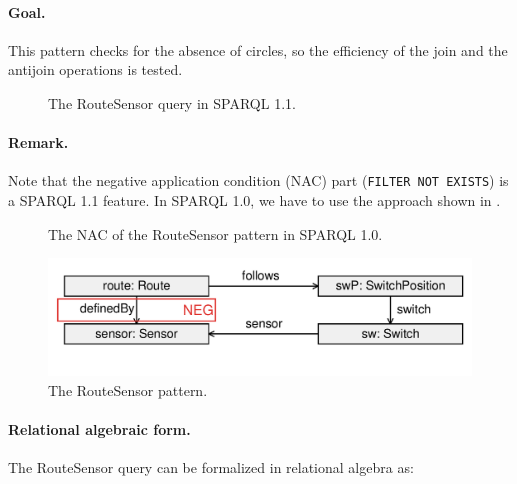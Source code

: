 \paragraph{Goal.} This pattern checks for the absence of circles, so the efficiency of the join and the antijoin operations is tested.

\begin{figure}[htb]
\centering
\begin{minipage}{0.9\textwidth}
  { \alignListing
    }
  \caption{The \textsf{RouteSensor} query in SPARQL 1.1.}
  \label{lst:routesensor-sparql-nac}
\end{minipage}
\end{figure}

\paragraph{Remark.} Note that the negative application condition (NAC) part (\texttt{FILTER NOT EXISTS}) is a SPARQL 1.1 feature. In SPARQL 1.0, we have to use the approach shown in .

\begin{figure}[htb]
\centering
\begin{minipage}{0.9\textwidth}
  { \alignListing
    }
  \caption{The NAC of the \textsf{RouteSensor} pattern in SPARQL 1.0.}
  \label{lst:routesensor-sparql-nac10}
\end{minipage}
\end{figure}

\begin{figure}[htb]
		\centering
		\includegraphics[scale=0.4]{figures/pattern-routesensor}
		\caption{The \textsf{RouteSensor} pattern.}
		\label{fig:pattern-routesensor}
\end{figure}

\paragraph{Relational algebraic form.}  The \textsf{RouteSensor} query can be formalized in relational algebra as:

